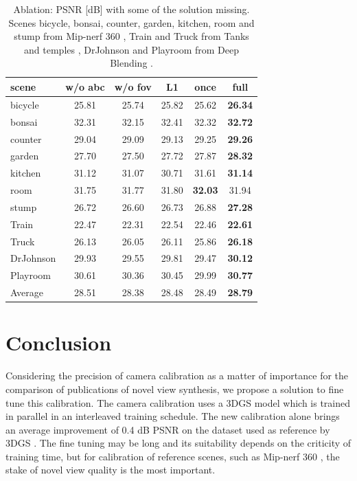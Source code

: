 \documentclass[a4paper,twoside,french]{article}
\begin{document}
\begin{table}[h]
  \small
	\begin{center}
    {
    \begin{tabular}{|p{1.2cm}|c|c|c|c|c|}
      \hline
				scene  & w/o abc & w/o fov & L1 & once & full \\
				\hline
				bicycle & 25.81 & 25.74 & 25.82 & 25.62 & \textbf{26.34} \\
				bonsai & 32.31 & 32.15 & 32.41 & 32.32 & \textbf{32.72} \\
				counter & 29.04 & 29.09 & 29.13 & 29.25 & \textbf{29.26} \\
				garden & 27.70 & 27.50 & 27.72 & 27.87 & \textbf{28.32} \\
				kitchen & 31.12 & 31.07 & 30.71 & 31.61 & \textbf{31.14} \\
				room & 31.75 & 31.77 & 31.80 & \textbf{32.03} & 31.94 \\
				stump & 26.72 & 26.60 & 26.73 & 26.88 & \textbf{27.28} \\
				Train & 22.47 & 22.31 & 22.54 & 22.46 & \textbf{22.61} \\
				Truck & 26.13 & 26.05 & 26.11 & 25.86 & \textbf{26.18} \\
				DrJohnson & 29.93 & 29.55 & 29.81 & 29.47 & \textbf{30.12} \\
				Playroom & 30.61 & 30.36 & 30.45 & 29.99 & \textbf{30.77} \\
        \hline
        Average & 28.51 & 28.38 & 28.48 & 28.49 & \textbf{28.79} \\
        \hline
			\end{tabular}
  }
	\caption{Ablation: PSNR [dB] with some of the solution missing. Scenes bicycle, bonsai, counter, garden, kitchen, room and stump
  from Mip-nerf 360 \cite{barron2022mip}, Train and Truck from Tanks and temples \cite{knapitsch2017tanks}, DrJohnson and
  Playroom from Deep Blending \cite{HPPFDB18}.}
	\label{table:ablation}
	\end{center}
\end{table}

\section{Conclusion}

Considering the precision of camera calibration as a matter of importance for the comparison of publications of
novel view synthesis, we propose a solution to fine tune this calibration. The camera calibration uses a 
3DGS model which is trained in parallel in an interleaved training schedule.
The new calibration alone brings an average improvement of 0.4 dB PSNR on the dataset used as reference by 3DGS \cite{kerbl20233d}.
The fine tuning may be long and its suitability depends on the criticity of training time, but for calibration
of reference scenes, such as Mip-nerf 360 \cite{barron2022mip}, the stake of novel view quality is the most important.
\end{document}

